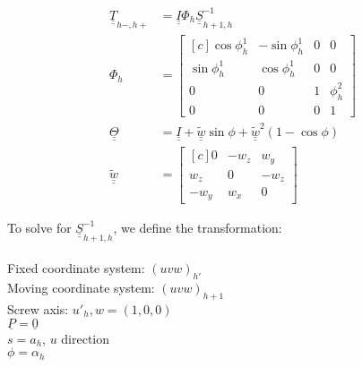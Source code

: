 \documentclass[onecolumn,10pt]{jhwhw}
\def\du#1{\underline{\underline{#1}}}
\begin{document}
\begin{align*}
\du{T}_{h-, h+} &= \du{I} \Phi_{h} \du{S}^{-1}_{h+1, h} \\
\Phi_{h} &=
\begin{bmatrix*}[c]
\cos \phi_h^1 & -\sin \phi_h^1 & 0 & 0 \\
\sin \phi_h^1 &  \cos \phi_h^1 & 0 & 0 \\
0 & 0 & 1 & \phi_h^2 \\
0 & 0 & 0 & 1
\end{bmatrix*} \\
\du{\Theta} &= \du{I} + \du{\widetilde{w}} \sin \phi + \du{\widetilde{w}}^2 \left ( 1 - \cos\phi \right ) \\
\du{\widetilde{w}} &= 
\begin{bmatrix*}[c]
0 & -w_z & w_y \\
w_z & 0 & -w_z \\
-w_y & w_x & 0
\end{bmatrix*} 
\end{align*}

To solve for $\du{S}^{-1}_{h+1, h}$, we define the transformation: \\
\\
Fixed coordinate system: $(u v w)_{h'}$ \\
Moving coordinate system: $(u v w)_{h+1}$ \\
Screw axis: $u'_h, w = (1, 0, 0)$ \\
$\underline{P} = \underline{0}$ \\
$s = a_h$, $u$ direction \\
$\phi = \alpha_h$
\end{document}
